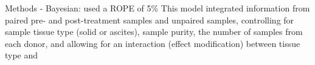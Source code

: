 Methods
 - Bayesian: used a ROPE of 5\%
 This model integrated information from paired pre- and post-treatment samples and unpaired samples, controlling for sample tissue type (solid or ascites), sample purity, the number of samples from each donor, and allowing for an interaction (effect modification) between tissue type and 
